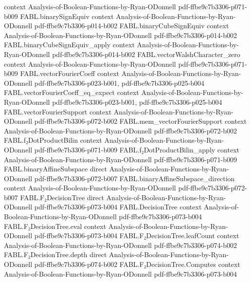 \begin{theorem}
  {context}
  {Analysis-of-Boolean-Functions-by-Ryan-ODonnell}
  {pdf-ffbe9c7b3306-p071-b009}
\proofstep
  {FABL.binarySignEquiv}
  {context}
  {Analysis-of-Boolean-Functions-by-Ryan-ODonnell}
  {pdf-ffbe9c7b3306-p014-b002}
\proofstep
  {FABL.binaryCubeSignEquiv}
  {context}
  {Analysis-of-Boolean-Functions-by-Ryan-ODonnell}
  {pdf-ffbe9c7b3306-p014-b002}
\proofstep
  {FABL.binaryCubeSignEquiv_apply}
  {context}
  {Analysis-of-Boolean-Functions-by-Ryan-ODonnell}
  {pdf-ffbe9c7b3306-p014-b002}
\proofstep
  {FABL.vectorWalshCharacter_zero}
  {context}
  {Analysis-of-Boolean-Functions-by-Ryan-ODonnell}
  {pdf-ffbe9c7b3306-p071-b009}
\proofstep
  {FABL.vectorFourierCoeff}
  {context}
  {Analysis-of-Boolean-Functions-by-Ryan-ODonnell}
  {pdf-ffbe9c7b3306-p023-b001,
    pdf-ffbe9c7b3306-p025-b004}
\proofstep
  {FABL.vectorFourierCoeff_eq_expect}
  {context}
  {Analysis-of-Boolean-Functions-by-Ryan-ODonnell}
  {pdf-ffbe9c7b3306-p023-b001,
    pdf-ffbe9c7b3306-p025-b004}
\proofstep
  {FABL.vectorFourierSupport}
  {context}
  {Analysis-of-Boolean-Functions-by-Ryan-ODonnell}
  {pdf-ffbe9c7b3306-p072-b002}
\proofstep
  {FABL.mem_vectorFourierSupport}
  {context}
  {Analysis-of-Boolean-Functions-by-Ryan-ODonnell}
  {pdf-ffbe9c7b3306-p072-b002}
\proofstep
  {FABL.f₂DotProductBilin}
  {context}
  {Analysis-of-Boolean-Functions-by-Ryan-ODonnell}
  {pdf-ffbe9c7b3306-p071-b009}
\proofstep
  {FABL.f₂DotProductBilin_apply}
  {context}
  {Analysis-of-Boolean-Functions-by-Ryan-ODonnell}
  {pdf-ffbe9c7b3306-p071-b009}
\proofstep
  {FABL.binaryAffineSubspace}
  {direct}
  {Analysis-of-Boolean-Functions-by-Ryan-ODonnell}
  {pdf-ffbe9c7b3306-p072-b007}
\proofstep
  {FABL.binaryAffineSubspace_direction}
  {context}
  {Analysis-of-Boolean-Functions-by-Ryan-ODonnell}
  {pdf-ffbe9c7b3306-p072-b007}
\proofstep
  {FABL.F₂DecisionTree}
  {direct}
  {Analysis-of-Boolean-Functions-by-Ryan-ODonnell}
  {pdf-ffbe9c7b3306-p073-b004}
\proofstep
  {FABL.DecisionTree}
  {context}
  {Analysis-of-Boolean-Functions-by-Ryan-ODonnell}
  {pdf-ffbe9c7b3306-p073-b004}
\proofstep
  {FABL.F₂DecisionTree.eval}
  {context}
  {Analysis-of-Boolean-Functions-by-Ryan-ODonnell}
  {pdf-ffbe9c7b3306-p073-b004}
\proofstep
  {FABL.F₂DecisionTree.leafCount}
  {context}
  {Analysis-of-Boolean-Functions-by-Ryan-ODonnell}
  {pdf-ffbe9c7b3306-p074-b002}
\proofstep
  {FABL.F₂DecisionTree.depth}
  {direct}
  {Analysis-of-Boolean-Functions-by-Ryan-ODonnell}
  {pdf-ffbe9c7b3306-p074-b002}
\proofstep
  {FABL.F₂DecisionTree.Computes}
  {context}
  {Analysis-of-Boolean-Functions-by-Ryan-ODonnell}
  {pdf-ffbe9c7b3306-p073-b004}

\end{theorem}
